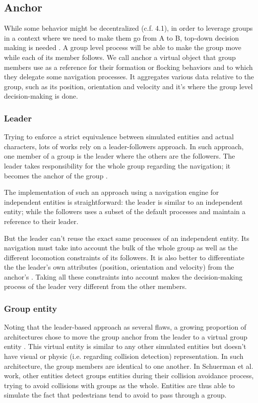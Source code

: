 \documentclass{article}
\begin{document}
\subsection{Anchor}

While some behavior might be decentralized (c.f. 4.1), in order to leverage groups in a context where we need to make them go from A to B, top-down decision making is needed \cite{MusTha2001}. A group level process will be able to make the group move while each of its member follows. 
We call anchor a virtual object that group members use as a reference for their formation or flocking behaviors and to which they delegate some navigation processes. It aggregates various data relative to the group, such as its position, orientation and velocity and it’s where the group level decision-making is done.

\subsubsection{Leader}

Trying to enforce a strict equivalence between simulated entities and actual characters, lots of works rely on a leader-followers approach. In such approach, one member of a group is the leader where the others are the followers. The leader takes responsibility for the whole group regarding the navigation; it becomes the anchor of the group \cite{Loscos:2003wh,Qiu:2010ks}.

The implementation of such an approach using a navigation engine for independent entities is straightforward: the leader is similar to an independent entity; while the followers uses a subset of the default processes and maintain a reference to their leader.

But the leader can’t reuse the exact same processes of an independent entity. Its navigation must take into account the bulk of the whole group as well as the different locomotion constraints of its followers. It is also better to differentiate the the leader’s own attributes (position, orientation and velocity) from the anchor’s \cite{Millington:2006wz}. Taking all these constraints into account makes the decision-making process of the leader very different from the other members.

\subsubsection{Group entity}

Noting that the leader-based approach as several flaws, a growing proportion of architectures chose to move the group anchor from the leader to a virtual group entity \cite{Schuerman:2010um,Silveira:2008bc,Karamouzas:2010fi}. This virtual entity is similar to any other simulated entities but doesn’t have visual or physic (i.e. regarding collision detection) representation. In such architecture, the group members are identical to one another. 
In Schuerman et al. \cite{Schuerman:2010um} work, other entities detect groups entities during their collision avoidance process, trying to avoid collisions with groups as the whole. Entities are thus able to simulate the fact that pedestrians tend to avoid to pass through a group.
\end{document}
